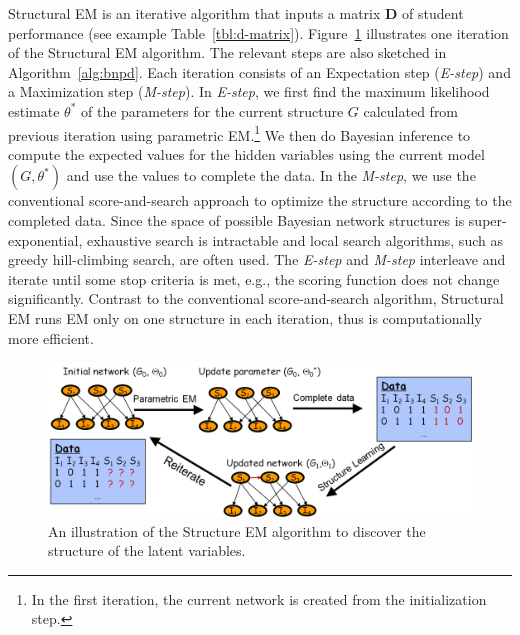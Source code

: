 \documentclass{edm_template}
\begin{document}
Structural EM is an iterative algorithm that  inputs a matrix $\mathbf{D}$ of student performance (see example Table~\ref{tbl:d-matrix}). %
Figure~\ref{fig:sem} illustrates one iteration of the Structural EM algorithm. The relevant steps are also sketched in Algorithm~\ref{alg:bnpd}. 
Each iteration consists of an Expectation step (\emph{E-step}) and a Maximization step (\emph{M-step}). 
In \emph{E-step}, we first find the maximum likelihood estimate $\theta^*$ of the parameters 
for the current structure $G$ calculated from previous iteration using parametric EM.\footnote{In the first iteration, the current network is created from the initialization step.}
We then do Bayesian inference to compute the expected values for the hidden variables using the current model $(G,\theta^*)$
and use the values to complete the data.
In the \emph{M-step}, we use the conventional score-and-search approach to optimize the structure according to the completed data.
Since the space of possible Bayesian network structures is super-exponential, 
exhaustive search is intractable and local search algorithms, such as greedy hill-climbing search, are often used.
The \emph{E-step} and \emph{M-step} interleave and iterate until some stop criteria is met, e.g., the scoring function does not change significantly.
Contrast to the conventional score-and-search algorithm, Structural EM runs EM only on one structure in each iteration, thus is computationally more efficient.

\begin{figure}
	\begin{center}
		\includegraphics[width=1.0\linewidth]{figures/sem.png}
	\end{center}
	\caption{\small An illustration of the Structure EM algorithm to discover the structure of the latent variables.}
	\label{fig:sem} 
\end{figure} 
\end{document}
